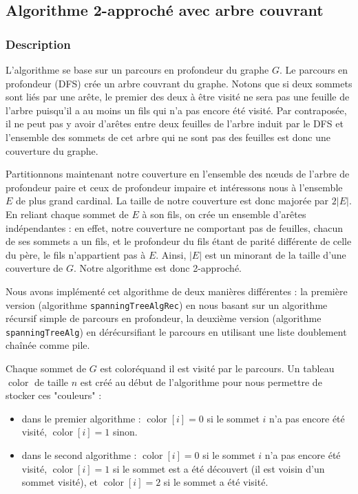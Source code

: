 \documentclass[a4paper,10pt]{article}
\DeclareMathOperator{\Color}{color}
\begin{document}
\subsection{Algorithme 2-approché avec arbre couvrant}

\subsubsection{Description}

L'algorithme se base sur un parcours en profondeur du graphe $G$. Le parcours en profondeur (DFS) crée un arbre couvrant du graphe. Notons que si deux sommets sont liés par une arête, le premier des deux à être visité ne sera pas une feuille de l'arbre puisqu'il a au moins un fils qui n'a pas encore été visité. Par contraposée, il ne peut pas y avoir d'arêtes entre deux feuilles de l'arbre induit par le DFS et l'ensemble des sommets de cet arbre qui ne sont pas des feuilles est donc une couverture du graphe. 

Partitionnons maintenant notre couverture en l'ensemble des nœuds de l'arbre de profondeur paire et ceux de profondeur impaire et intéressons nous à l'ensemble $E$ de plus grand cardinal. La taille de notre couverture est donc majorée par $2|E|$. En reliant chaque sommet de $E$ à son fils, on crée un ensemble d'arêtes indépendantes : en effet, notre couverture ne comportant pas de feuilles, chacun de ses sommets a un fils, et le profondeur du fils étant de parité différente de celle du père, le fils n'appartient pas à $E$. Ainsi, $|E|$ est un minorant de la taille d'une couverture de $G$. Notre algorithme est donc 2-approché.

\bigskip
Nous avons implémenté cet algorithme de deux manières différentes : la première version (algorithme \texttt{spanningTreeAlgRec}) en nous basant sur un algorithme récursif simple de parcours en profondeur, la deuxième version (algorithme \texttt{spanningTreeAlg}) en dérécursifiant le parcours en utilisant une liste doublement chaînée comme pile.

Chaque sommet de $G$ est \og coloré\fg quand il est visité par le parcours. Un tableau $\Color$ de taille $n$ est créé au début de l'algorithme pour nous permettre de stocker ces "couleurs" : 

\begin{itemize}
\item dans le premier algorithme : $\Color[i] = 0$ si le sommet $i$ n'a pas encore été visité, $\Color[i] = 1$ sinon.
\item dans le second algorithme : $\Color[i] = 0$ si le sommet $i$ n'a pas encore été visité, $\Color[i] = 1$ si le sommet est a été découvert (il est voisin d'un sommet visité), et $\Color[i] = 2$ si le sommet a été visité.
\end{itemize}
\end{document}
